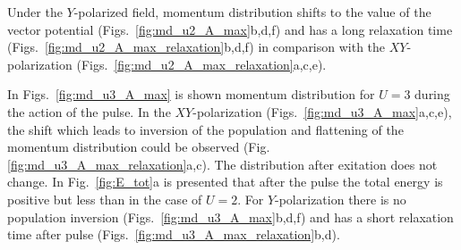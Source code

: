 Under the $Y$-polarized field, momentum distribution shifts to the value of the vector potential (Figs.~\ref{fig:md_u2_A_max}b,d,f) and has a long relaxation time (Figs.~\ref{fig:md_u2_A_max_relaxation}b,d,f) in comparison with the $XY$-polarization (Figs.~\ref{fig:md_u2_A_max_relaxation}a,c,e).

In Figs.~\ref{fig:md_u3_A_max} is shown momentum distribution for $U=3$ during the action of the pulse. In the $XY$-polarization (Figs.~\ref{fig:md_u3_A_max}a,c,e), the shift which leads to inversion of the population and flattening of the momentum distribution could be observed (Fig. \ref{fig:md_u3_A_max_relaxation}a,c). The distribution after exitation does not change. In Fig.~\ref{fig:E_tot}a is presented that after the pulse the total energy is positive but less than in the case of $U=2$. For $Y$-polarization there is no population inversion (Figs.~\ref{fig:md_u3_A_max}b,d,f) and has a short relaxation time after pulse (Figs.~\ref{fig:md_u3_A_max_relaxation}b,d).



